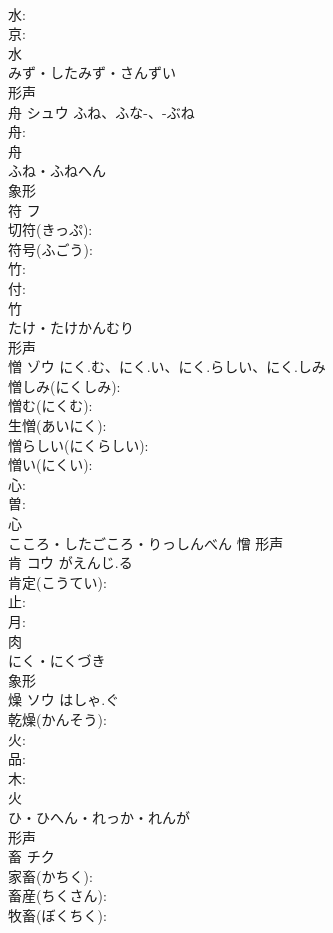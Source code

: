 \documentclass[8pt]{extreport}
\begin{document}
\begin{CJK}{UTF8}{min}
\\	水: 
\\	京: 
\\	水	
\\	みず・したみず・さんずい	
\\	形声 
\\	舟	シュウ	ふね、ふな-、-ぶね		
\\	舟: 
\\	舟	
\\	ふね・ふねへん	
\\	象形 
\\	符	フ			
\\	切符(きっぷ): 
\\	符号(ふごう): 
\\	竹: 
\\	付: 
\\	竹	
\\	たけ・たけかんむり	
\\	形声 
\\	憎	ゾウ	にく.む、にく.い、にく.らしい、にく.しみ		
\\	憎しみ(にくしみ): 
\\	憎む(にくむ): 
\\	生憎(あいにく): 
\\	憎らしい(にくらしい): 
\\	憎い(にくい): 
\\	心: 
\\	曽: 
\\	心	
\\	こころ・したごころ・りっしんべん	憎	形声 
\\	肯	コウ	がえんじ.る		
\\	肯定(こうてい): 
\\	止: 
\\	月: 
\\	肉	
\\	にく・にくづき	
\\	象形 
\\	燥	ソウ	はしゃ.ぐ		
\\	乾燥(かんそう): 
\\	火: 
\\	品: 
\\	木: 
\\	火	
\\	ひ・ひへん・れっか・れんが	
\\	形声 
\\	畜	チク			
\\	家畜(かちく): 
\\	畜産(ちくさん): 
\\	牧畜(ぼくちく): 

\end{CJK}
\end{document}
